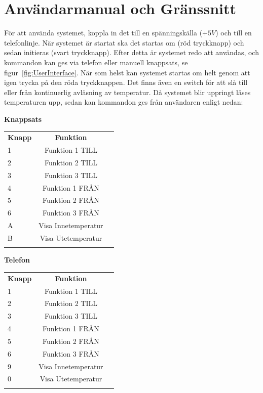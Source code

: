 \documentclass[a4paper,11pt]{article}
\begin{document}
	\addappheadtotoc

	\section{Användarmanual och Gränssnitt}
	\label{sec:Manual}
	För att använda systemet, koppla in det till en spänningskälla ($+5V$) och till en telefonlinje.
	När systemet är startat ska det startas om (röd tryckknapp) och sedan initieras (svart tryckknapp).
	Efter detta är systemet redo att användas, och kommandon kan ges via telefon eller manuell knappsats, se figur~\ref{fig:UserInterface}.
	När som helst kan systemet startas om helt genom att igen trycka på den röda tryckknappen. Det finns även en switch för
	att slå till eller från kontinuerlig avläsning av temperatur.
	Då systemet blir uppringt läses temperaturen upp, sedan kan kommandon ges från användaren enligt nedan:\\

	\begin{table}[ht]
		\begin{minipage}[b]{0.5\linewidth}\centering
			{\bf Knappsats}\\
			\begin{tabular}{l c r}
				\\{\bf Knapp} & {\bf Funktion}\\
				1 & Funktion 1 TILL\\		
				2 & Funktion 2 TILL\\		
				3 & Funktion 3 TILL\\
				4 & Funktion 1 FRÅN\\	
				5 & Funktion 2 FRÅN\\
				6 & Funktion 3 FRÅN\\		
				A & Visa Innetemperatur\\
				B & Visa Utetemperatur \\\\
			\end{tabular}
	 	\end{minipage}
	 	\hspace{0.5cm}
	 	\begin{minipage}[b]{0.5\linewidth}
			\centering
			{\bf Telefon}\\
			\begin{tabular}{l c r}
				\\{\bf Knapp} & {\bf Funktion}\\
				1 & Funktion 1 TILL\\		
				2 & Funktion 2 TILL\\		
				3 & Funktion 3 TILL\\
				4 & Funktion 1 FRÅN\\	
				5 & Funktion 2 FRÅN\\
				6 & Funktion 3 FRÅN\\
				9 & Visa Innetemperatur\\
				0 & Visa Utetemperatur \\\\
			\end{tabular}
	 	\end{minipage}
	\end{table}
\end{document}
